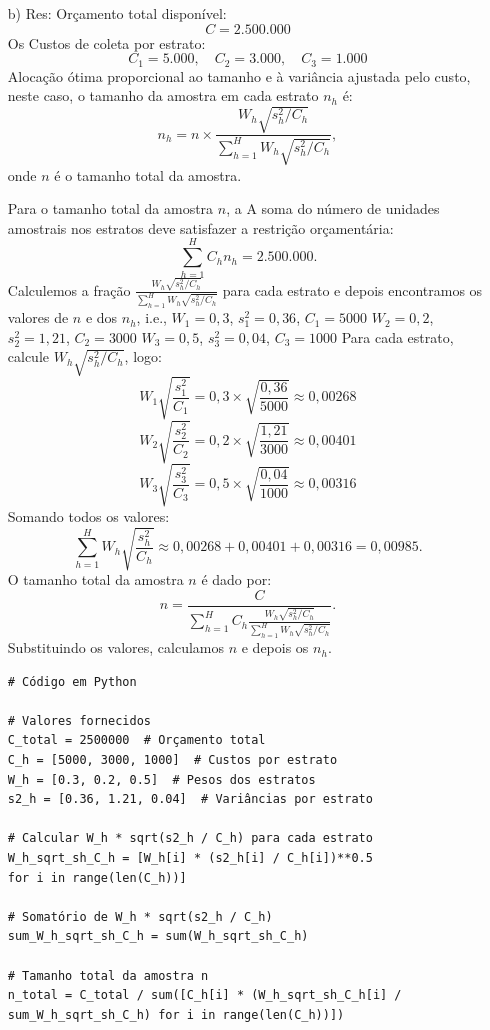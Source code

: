 \documentclass[a4paper,12pt,oneside,twocolumn]{Config/milktest}
\begin{document}
{\begin{itemize}
\item[b) Res:] Orçamento total disponível:
   \[
   C = 2.500.000
   \]
Os Custos de coleta por estrato:
   \[
   C_1 = 5.000, \quad C_2 = 3.000, \quad C_3 = 1.000
   \]
Alocação ótima proporcional ao tamanho e à variância ajustada pelo custo, neste caso, o tamanho da amostra em cada estrato \( n_h \) é:
   \[
   n_h = n \times \frac{W_h \sqrt{s_h^2/C_h}}{\sum_{h=1}^{H} W_h \sqrt{s_h^2/C_h}},
   \]
   onde \( n \) é o tamanho total da amostra.

Para o tamanho total da amostra \( n \), a  A soma do número de unidades amostrais nos estratos deve satisfazer a restrição orçamentária:
   \[
   \sum_{h=1}^{H} C_h n_h = 2.500.000.
   \]
Calculemos  a fração \( \frac{W_h \sqrt{s_h^2/C_h}}{\sum_{h=1}^{H} W_h \sqrt{s_h^2/C_h}} \) para cada estrato e depois  encontramos os valores de \( n \) e dos \( n_h \), i.e., 
\( W_1 = 0,3 \), \( s_1^2 = 0,36 \), \( C_1 = 5000 \)
\( W_2 = 0,2 \), \( s_2^2 = 1,21 \), \( C_2 = 3000 \)
\( W_3 = 0,5 \), \( s_3^2 = 0,04 \), \( C_3 = 1000 \)
Para cada estrato, calcule \( W_h \sqrt{s_h^2 / C_h} \), logo:
  \[
  W_1 \sqrt{\frac{s_1^2}{C_1}} = 0,3 \times \sqrt{\frac{0,36}{5000}} \approx 0,00268
  \]
  \[
  W_2 \sqrt{\frac{s_2^2}{C_2}} = 0,2 \times \sqrt{\frac{1,21}{3000}} \approx 0,00401
  \]
  \[
  W_3 \sqrt{\frac{s_3^2}{C_3}} = 0,5 \times \sqrt{\frac{0,04}{1000}} \approx 0,00316
  \]
  Somando todos os valores:
\[
\sum_{h=1}^{H} W_h \sqrt{\frac{s_h^2}{C_h}} \approx 0,00268 + 0,00401 + 0,00316 = 0,00985.
\]
O  tamanho total da amostra \( n \) é dado por:
\[
n = \frac{C}{\sum_{h=1}^{H} C_h \frac{W_h \sqrt{s_h^2 / C_h}}{\sum_{h=1}^{H} W_h \sqrt{s_h^2 / C_h}}}.
\]
Substituindo os valores, calculamos \( n \) e depois os \( n_h \).

\begin{verbatim}
# Código em Python

# Valores fornecidos
C_total = 2500000  # Orçamento total
C_h = [5000, 3000, 1000]  # Custos por estrato
W_h = [0.3, 0.2, 0.5]  # Pesos dos estratos
s2_h = [0.36, 1.21, 0.04]  # Variâncias por estrato

# Calcular W_h * sqrt(s2_h / C_h) para cada estrato
W_h_sqrt_sh_C_h = [W_h[i] * (s2_h[i] / C_h[i])**0.5 
for i in range(len(C_h))]

# Somatório de W_h * sqrt(s2_h / C_h)
sum_W_h_sqrt_sh_C_h = sum(W_h_sqrt_sh_C_h)

# Tamanho total da amostra n
n_total = C_total / sum([C_h[i] * (W_h_sqrt_sh_C_h[i] / 
sum_W_h_sqrt_sh_C_h) for i in range(len(C_h))])


\end{verbatim}
\end{itemize}}
\end{document}
